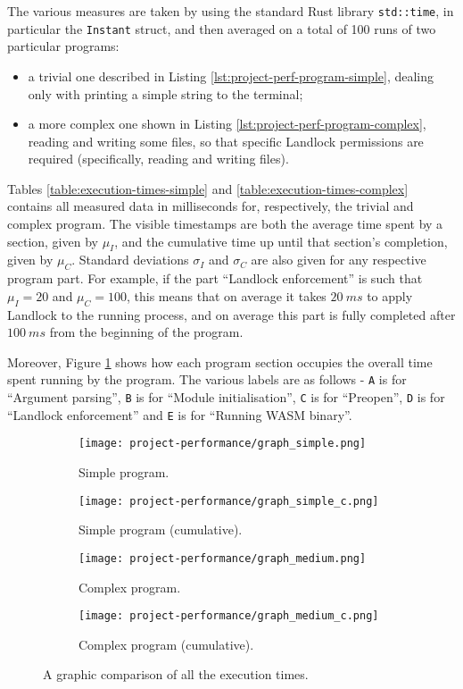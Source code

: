 The various measures are taken by using the standard Rust library \texttt{std::time},
in particular the \texttt{Instant} struct, and then averaged on a total of 100 runs of
two particular programs:
\begin{itemize}
  \item a trivial one described in Listing \ref{lst:project-perf-program-simple},
        dealing only with printing a simple string to the terminal;
  \item a more complex one shown in Listing \ref{lst:project-perf-program-complex},
        reading and writing some files, so that specific Landlock permissions are required
        (specifically, reading and writing files).
\end{itemize}

Tables \ref{table:execution-times-simple} and \ref{table:execution-times-complex} contains
all measured data in milliseconds for, respectively, the trivial and complex program.
The visible timestamps are both the average time spent by a section, given by $\mu_I$,
and the cumulative time up until that section's completion, given by $\mu_C$.
Standard deviations $\sigma_I$ and $\sigma_C$ are also given for any respective program part.
For example, if the part ``Landlock enforcement'' is such that $\mu_I = 20$ and $\mu_C = 100$,
this means that on average it takes $20\ ms$ to apply Landlock to the running process, and on average this part
is fully completed after $100\ ms$ from the beginning of the program.

Moreover, Figure \ref{fig:perf-execution-times-comparison} shows how each program section
occupies the overall time spent running by the program. The various labels are as follows
- \texttt{A} is for ``Argument parsing'', \texttt{B} is for ``Module initialisation'',
\texttt{C} is for ``Preopen'', \texttt{D} is for ``Landlock enforcement'' and
\texttt{E} is for ``Running WASM binary''.

\begin{figure}[ht!]
  \centering
  
  \begin{subfigure}[b]{0.46\textwidth}
    \texttt{[image: project-performance/graph\_simple.png]}
    \caption{Simple program.}
  \end{subfigure}
  \begin{subfigure}[b]{0.46\textwidth}
    \texttt{[image: project-performance/graph\_simple\_c.png]}
    \caption{Simple program (cumulative).}
  \end{subfigure}

  \begin{subfigure}[b]{0.46\textwidth}
    \texttt{[image: project-performance/graph\_medium.png]}
    \caption{Complex program.}
  \end{subfigure}
  \begin{subfigure}[b]{0.46\textwidth}
    \texttt{[image: project-performance/graph\_medium\_c.png]}
    \caption{Complex program (cumulative).}
  \end{subfigure}

  \caption{A graphic comparison of all the execution times.}
  \label{fig:perf-execution-times-comparison}
\end{figure}

